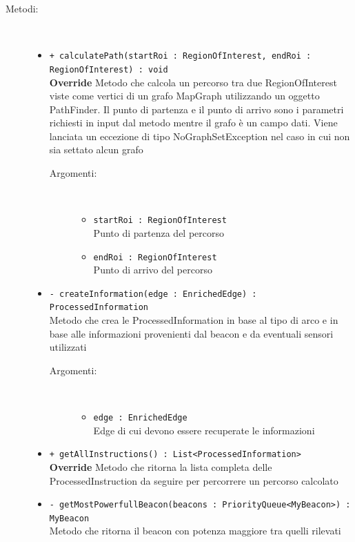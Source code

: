 \documentclass[../DefinizioneDiProdotto.tex]{subfiles}
\begin{document}
\begin{description}
\begin{itemize}
\end{itemize}
\item[Metodi:] \
\begin{itemize}
\item \texttt{+ calculatePath(startRoi : RegionOfInterest, endRoi :\\RegionOfInterest) : void}\\
\textbf{Override} Metodo che calcola un percorso tra due RegionOfInterest viste come vertici di un grafo MapGraph utilizzando un oggetto PathFinder. Il punto di partenza e il punto di arrivo sono i parametri richiesti in input dal metodo mentre il grafo è un campo dati. Viene lanciata un eccezione di tipo NoGraphSetException nel caso in cui non sia settato alcun grafo
 \begin{description}
\item[Argomenti:] \
\begin{itemize}
\item \texttt{startRoi : RegionOfInterest}\\
Punto di partenza del percorso\item \texttt{endRoi : RegionOfInterest}\\
Punto di arrivo del percorso\end{itemize}
\end{description}
\item \texttt{- createInformation(edge : EnrichedEdge) : ProcessedInformation}\\
Metodo che crea le ProcessedInformation in base al tipo di arco e in base alle informazioni provenienti dal beacon e da eventuali sensori utilizzati
 \begin{description}
\item[Argomenti:] \
\begin{itemize}
\item \texttt{edge : EnrichedEdge}\\
Edge di cui devono essere recuperate le informazioni\end{itemize}
\end{description}
\item \texttt{+ getAllInstructions() : List<ProcessedInformation>}\\
\textbf{Override} Metodo che ritorna la lista completa delle ProcessedInstruction da seguire per percorrere un percorso calcolato
 \item \texttt{- getMostPowerfullBeacon(beacons : PriorityQueue<MyBeacon>) : MyBeacon}\\
Metodo che ritorna il beacon con potenza maggiore tra quelli rilevati

\end{itemize}
\end{description}
\end{document}
